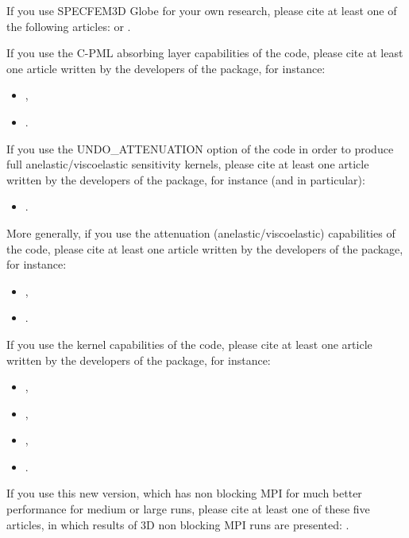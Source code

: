 If you use SPECFEM3D Globe for your own research, please cite at least one
of the following articles: \cite{KoXiBoPeSaLiTr16,TrKoLi08,PeKoLuMaLeCaLeMaLiBlNiBaTr11,VaCaSaKoVi99,LeChLiKoHuTr08,LeChKoHuTr09,LeKoHuTr09,KoMiEr09,KoErGoMi10,WiKoScTr04,KoLiTrSuStSh04,ChKoViCaVaFe07,MaKoDi09,KoViCh10,CaKoLaTiMiLeSnTr08,TrKoHjLiZhPeBoMcFrTrHu10,KoRiTr02,KoTr02a,KoTr02b,KoTr99} or \cite{KoVi98}.\newline


If you use the C-PML absorbing layer capabilities of the code, please cite at least one article
written by the developers of the package, for instance:
%
\begin{itemize}
\item \cite{XiKoMaMa14},
\item \cite{XiMaCrKoMa16}.
\end{itemize}
%
If you use the UNDO\_ATTENUATION option of the code in order to produce full anelastic/viscoelastic sensitivity kernels, please cite at least one article
written by the developers of the package, for instance (and in particular):
%
\begin{itemize}
\item \cite{KoXiBoPeSaLiTr16}.
\end{itemize}
%
More generally, if you use the attenuation (anelastic/viscoelastic) capabilities of the code, please cite at least one article
written by the developers of the package, for instance:
%
\begin{itemize}
\item \cite{KoXiBoPeSaLiTr16},
\item \cite{BlKoChLoXi16}.
\end{itemize}
%
If you use the kernel capabilities of the code, please cite at least one article
written by the developers of the package, for instance:
%
\begin{itemize}
\item \cite{TrKoLi08},
\item \cite{PeKoLuMaLeCaLeMaLiBlNiBaTr11},
\item \cite{LiTr06},
\item \cite{MoLuTr09}.
\end{itemize}


If you use this new version, which has non blocking MPI for much better performance for medium or large runs,
please cite at least one of these five articles,
in which results of 3D non blocking MPI runs are presented: \cite{KoErGoMi10,KoViCh10,Kom11,PeKoLuMaLeCaLeMaLiBlNiBaTr11,CaKoLaTiMiLeSnTr08}.\newline


